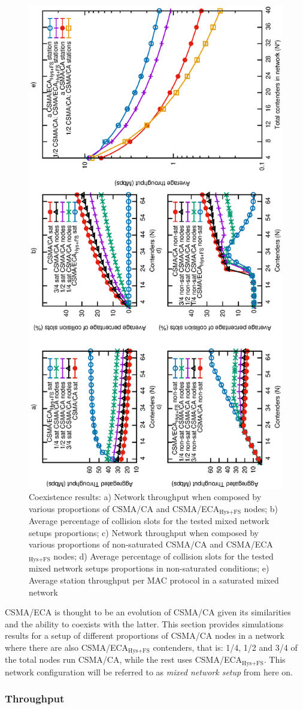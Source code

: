 	\begin{figure}[tb]
		\centering
		\includegraphics[width=0.5\linewidth,angle=-90]{figures/tonFigs/coexistence-combined.eps}
		\caption{Coexistence results: a) Network throughput when composed by various proportions of CSMA/CA and CSMA/ECA$_{\text{Hys+FS}}$ nodes; b) Average percentage of collision slots for the tested mixed network setups proportions; c) Network throughput when composed by various proportions of non-saturated CSMA/CA and CSMA/ECA$_{\text{Hys+FS}}$ nodes; d) Average percentage of collision slots for the tested mixed network setups proportions in non-saturated conditions; e) Average station throughput per MAC protocol in a saturated mixed network}
		\label{fig:coexResults}
	\end{figure}
	
	
	CSMA/ECA is thought to be an evolution of CSMA/CA given its similarities and the ability to coexists with the latter. This section provides simulations results for a setup of different proportions of CSMA/CA nodes in a network where there are also CSMA/ECA$_{\text{Hys+FS}}$ contenders, that is: 1/4, 1/2 and 3/4 of the total nodes run CSMA/CA, while the rest uses CSMA/ECA$_{\text{Hys+FS}}$. This network configuration will be referred to as \emph{mixed network setup} from here on.	
	\subsubsection{Throughput}
	
